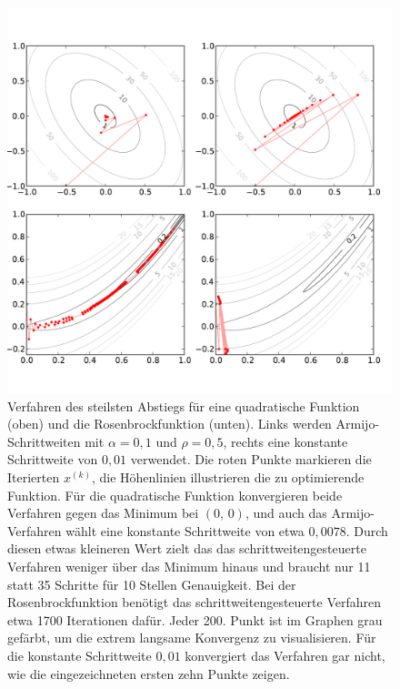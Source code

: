 \begin{figure}
  \centering
  \includegraphics[width=\textwidth]{plots/steepestdescent}
  \caption{Verfahren des steilsten Abstiegs für eine quadratische
    Funktion (oben) und die Rosenbrockfunktion (unten). Links werden
    Armijo-Schrittweiten mit $\alpha=0,1$ und $\rho=0,5$, rechts eine
    konstante Schrittweite von $0,01$ verwendet. Die roten Punkte
    markieren die Iterierten $x^{(k)}$, die Höhenlinien illustrieren
    die zu optimierende Funktion. Für die quadratische Funktion
    konvergieren beide Verfahren gegen das Minimum bei $(0,\,0)$, und
    auch das Armijo-Verfahren wählt eine konstante Schrittweite von
    etwa $0,0078$. Durch diesen etwas kleineren Wert zielt das das
    schrittweitengesteuerte Verfahren weniger über das Minimum hinaus
    und braucht nur 11 statt 35 Schritte für 10 Stellen
    Genauigkeit. Bei der Rosenbrockfunktion benötigt das
    schrittweitengesteuerte Verfahren etwa 1700 Iterationen dafür.
    Jeder 200. Punkt ist im Graphen grau gefärbt, um die extrem
    langsame Konvergenz zu visualisieren. Für die konstante
    Schrittweite $0,01$ konvergiert das Verfahren gar nicht, wie die
    eingezeichneten ersten zehn Punkte zeigen.} \label{fig:armijo}
\end{figure}

